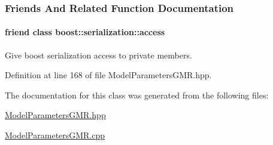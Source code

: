 \subsubsection{Friends And Related Function Documentation}
\hypertarget{classDmpBbo_1_1ModelParametersGMR_ac98d07dd8f7b70e16ccb9a01abf56b9c}{
\paragraph[{boost\+::serialization\+::access}]{\setlength{\rightskip}{0pt plus 5cm}friend class boost\+::serialization\+::access\hspace{0.3cm}{\ttfamily [friend]}}}\label{classDmpBbo_1_1ModelParametersGMR_ac98d07dd8f7b70e16ccb9a01abf56b9c}


Give boost serialization access to private members. 



Definition at line 168 of file Model\+Parameters\+G\+M\+R.\+hpp.



The documentation for this class was generated from the following files\+:\begin{DoxyCompactItemize}
\item 
\hyperlink{ModelParametersGMR_8hpp}{Model\+Parameters\+G\+M\+R.\+hpp}\item 
\hyperlink{ModelParametersGMR_8cpp}{Model\+Parameters\+G\+M\+R.\+cpp}\end{DoxyCompactItemize}
